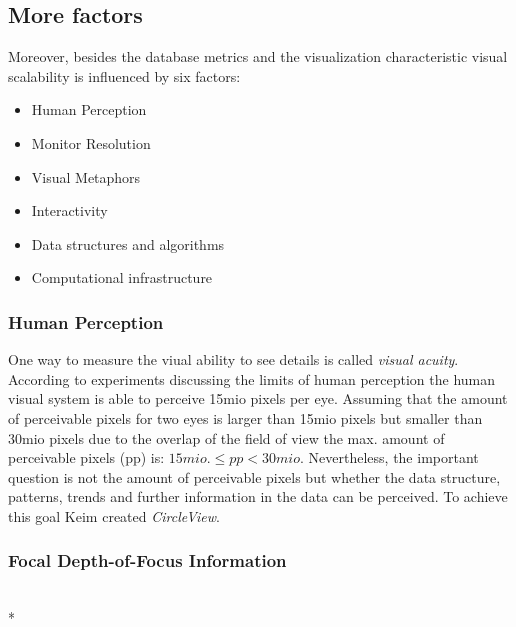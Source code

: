 


\subsection{More factors} \label{factors}
Moreover, besides the database metrics and the visualization characteristic visual scalability is influenced by six factors: 
\begin{itemize}
    \item Human Perception\cite{Keim2005,Deering1998}
    \item Monitor Resolution 
    \item Visual Metaphors
    \item Interactivity
    \item Data structures and algorithms
    \item Computational infrastructure
\end{itemize}

\subsubsection*{Human Perception} 
One way to measure the viual ability to see details is called \textit{visual acuity}\cite{Ware2012a}. 
According to experiments discussing the limits of human perception \cite{Deering1998} the human visual system is able to perceive 15mio pixels per eye. Assuming that the amount of perceivable pixels for two eyes is larger than 15mio pixels but smaller than 30mio pixels due to the overlap of the field of view the max. amount of perceivable pixels (pp) is:
\begin{math}
15 mio. \leq pp < 30 mio.
\end{math}
Nevertheless, the important question is not the amount of perceivable pixels but whether the data structure, patterns, trends and further information in the data can be perceived. To achieve this goal Keim\cite{Keim2005} created \textit{CircleView}.
\subsubsection*{Focal Depth-of-Focus Information}
\\*
